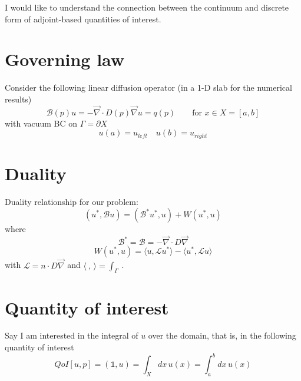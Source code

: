 \documentclass[11pt]{article}
\renewcommand{\div}{\vec{\nabla}\! \cdot \!}
\newcommand{\grad}{\vec{\nabla}}
\newcommand{\be}{\begin{equation}}
\newcommand{\ee}{\end{equation}}
\newcommand{\mc}[1]{\mathcal{#1}}
\newcommand{\us}{{u^\ast}}
\begin{document}

I would like to understand the connection between the continuum and discrete form of adjoint-based quantities
of interest.\\


\section{Governing law}

Consider the following linear diffusion operator (in a 1-D slab for the numerical results)
\be
\mc{B}(p)u = -\div D(p) \grad u  = q(p) \qquad \text{for } x \in X=[a,b]
\ee
with vacuum BC on $\Gamma=\partial X$
\be
u(a)=u_{left} \quad u(b)=u_{right}
\ee

\section{Duality}


Duality relationship for our problem:
\be
(\us,\mc{B}u) = (\mc{B}^\ast\us,u) + W(\us,u)
\ee
where
\be
\mc{B}^\ast= \mc{B} =  -\div D \grad  
\ee
\be
W(\us,u) = \langle u, \mc{L} \us \rangle  -  \langle \us, \mc{L} u \rangle
\ee
with $\mc{L} = n \cdot D\grad$ and $\langle \  , \, \rangle = \int_{\Gamma}\ $.


\section{Quantity of interest}


Say I am interested in the integral of $u$ over the domain, that is, in the following quantity of interest
\be
QoI[u,p] = \left(\mathds{1}, u \right) = \int_X  dx \, u(x) = \int_a^b dx \, u(x)
\ee

\end{document}
